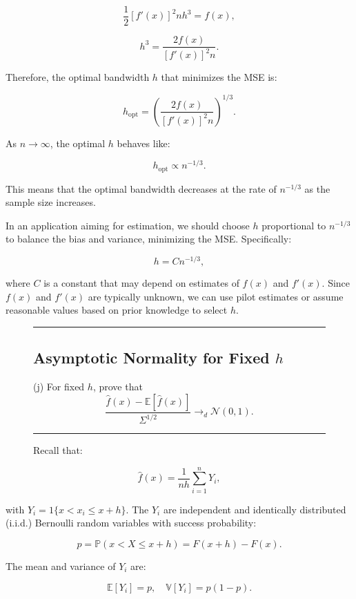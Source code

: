 \documentclass{article}
\newenvironment{colorparagraph}[1]{\par\color{#1}}{\par}
\begin{document}
\[
\frac{1}{2} [f'(x)]^2 n h^3 = f(x),
\]

\[
h^3 = \frac{2 f(x)}{[f'(x)]^2 n}.
\]

Therefore, the optimal bandwidth \( h \) that minimizes the MSE is:

\[
h_{\text{opt}} = \left( \frac{2 f(x)}{[f'(x)]^2 n} \right)^{1/3}.
\]

As \( n \to \infty \), the optimal \( h \) behaves like:

\[
h_{\text{opt}} \propto n^{-1/3}.
\]

This means that the optimal bandwidth decreases at the rate of \( n^{-1/3} \) as the sample size increases.

In an application aiming for estimation, we should choose \( h \) proportional to \( n^{-1/3} \) to balance the bias and variance, minimizing the MSE. Specifically:

\[
h = C n^{-1/3},
\]

where \( C \) is a constant that may depend on estimates of \( f(x) \) and \( f'(x) \). Since \( f(x) \) and \( f'(x) \) are typically unknown, we can use pilot estimates or assume reasonable values based on prior knowledge to select \( h \).

\begin{figure}[H]
\begin{colorparagraph}{questioncolor}
\label{q2j}
\rule{\textwidth}{0.5pt}
\subsection{Asymptotic Normality for Fixed \( h \)}
(j) For fixed \( h \), prove that
\[
\frac{\hat{f}(x) - \mathbb{E}[\hat{f}(x)]}{\Sigma^{1/2}} \to_d \mathcal{N}(0, 1).
\]

\rule{\textwidth}{0.5pt}
\end{colorparagraph}

Recall that:
\end{figure}

\[
\hat{f}(x) = \frac{1}{n h} \sum_{i=1}^n Y_i,
\]

with \( Y_i = 1\{ x < x_i \leq x + h \} \). The \( Y_i \) are independent and identically distributed (i.i.d.) Bernoulli random variables with success probability:

\[
p = \mathbb{P}(x < X \leq x + h) = F(x + h) - F(x).
\]

The mean and variance of \( Y_i \) are:

\[
\mathbb{E}[Y_i] = p, \quad \mathbb{V}[Y_i] = p (1 - p).
\]
\end{document}

